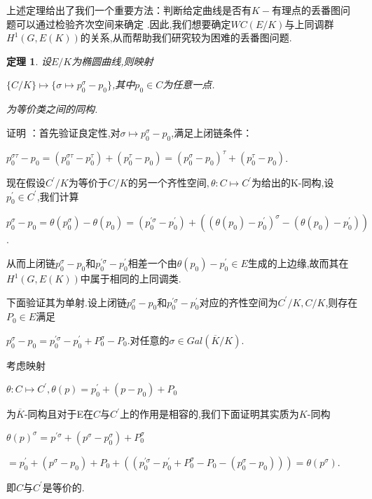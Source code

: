 \documentclass[11pt]{ctexart}
\newtheorem{thm}{定理}[section]
\begin{document}
上述定理给出了我们一个重要方法：判断给定曲线是否有$K-$有理点的丢番图问题可以通过检验齐次空间来确定
.因此,我们想要确定$WC(E/K)$与上同调群$H^1(G,E(K))$的关系,从而帮助我们研究较为困难的丢番图问题.
\begin{thm}设$E/K$为椭圆曲线,则映射
    \begin{center}
        $\{C/K\}\mapsto \{\sigma \mapsto p_0^{\sigma}-p_0\}$,其中$p_0 \in C$为任意一点.
    \end{center}
    为等价类之间的同构.
\end{thm}
\noindent 证明 ：首先验证良定性,对$\sigma \mapsto p_0^{\sigma}-p_0$,满足上闭链条件：
\begin{center}
    $p_0^{\sigma\tau}-p_0=(p_0^{\sigma\tau}-p_0^{\tau})+(p_0^{\tau}-p_0)=(p_0^{\sigma}-p_0)^{\tau}+(p_0^{\tau}-p_0)$.
\end{center}
现在假设$C^{\prime}/K$为等价于$C/K$的另一个齐性空间$,\theta:C\mapsto C^{\prime}$为给出的K-同构,设$p_0^{\prime}\in C^{\prime}$,我们计算
\begin{center}
    $p_0^{\sigma}-p_0=\theta(p_0^{\sigma})-\theta(p_0)=(p_0^{\prime\sigma}-p_0^{\prime})+((\theta(p_0)-p_0^{\prime})^{\sigma}-(\theta(p_0)-p_0^{\prime}))$.
\end{center}
从而上闭链$p_0^{\sigma}-p_0$和$p_0^{\prime\sigma}-p_0^{\prime}$相差一个由$\theta(p_0)-p_0^{\prime} \in E$生成的上边缘,故而其在$H^1(G,E(K))$中属于相同的上同调类.

下面验证其为单射.设上闭链$p_0^{\sigma}-p_0$和$p_0^{\prime\sigma}-p_0^{\prime}$对应的齐性空间为$C^{\prime}/K$$,C/K$,则存在$P_0\in E$满足
\begin{center}
    $p_0^{\sigma}-p_0=p_0^{\prime\sigma}-p_0^{\prime}+P_0^{\sigma}-P_0$.对任意的$\sigma \in Gal(\overline{K}/K)$.
\end{center}
考虑映射
\begin{center}
    $\theta:C\mapsto C^{\prime}$$,\theta(p)=p_0^{\prime}+(p-p_0)+P_0$
\end{center}
为$\overline{K}$-同构且对于E在$C$与$C^{\prime}$上的作用是相容的,我们下面证明其实质为$K$-同构
\begin{center}
    $\theta(p)^{\sigma}=p^{\prime\sigma}+(p^{\sigma}-p_0^{\sigma})+P_0^{\sigma}$
\end{center}
\begin{center}
       $ =p_0^{\prime}+(p^{\sigma}-p_0)+P_0+((p_0^{\prime\sigma}-p_0^{\prime}+P_0^{\sigma}-P_0-(p_0^{\sigma}-p_0)))=\theta(p^{\sigma})$.
\end{center}
即$C$与$C^{\prime}$是等价的.
\end{document}

